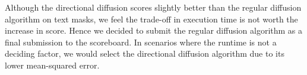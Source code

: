 Although the directional diffusion scores slightly better than the regular diffusion algorithm on text masks, we feel the trade-off in execution time is not worth the increase in score. Hence we decided to submit the regular diffusion algorithm as a final submission to the scoreboard. In scenarios where the runtime is not a deciding factor, we would select the directional diffusion algorithm due to its lower mean-squared error.